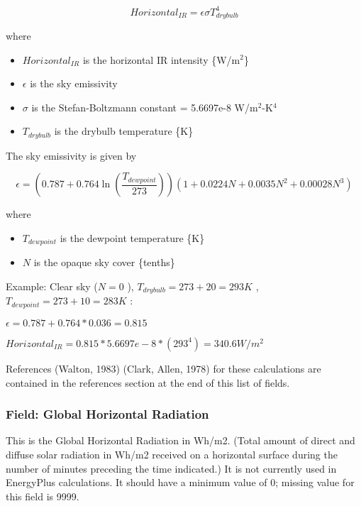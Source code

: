 \begin{equation}
Horizontal_{IR} = \epsilon\sigma T^4_{drybulb}
\end{equation}

where

\begin{itemize}
\tightlist
\item
  \(Horizontal_{IR}\) is the horizontal IR intensity \{W/m\(^{2}\)\}
\item
  \(\epsilon\) is the sky emissivity
\item
  \(\sigma\) is the Stefan-Boltzmann constant = 5.6697e-8 W/m\(^{2}\)-K\(^{4}\)
\item
  \(T_{drybulb}\) is the drybulb temperature \{K\}
\end{itemize}

The sky emissivity is given by

\begin{equation}
\epsilon = \left( 0.787 +0.764 \ln\left(\frac{T_{dewpoint}}{273}\right)\right)\left( 1 + 0.0224N + 0.0035N^2 + 0.00028N^3 \right)
\end{equation}

where

\begin{itemize}
\tightlist
\item
  \(T_{dewpoint}\) is the dewpoint temperature \{K\}
\item
  \(N\) is the opaque sky cover \{tenths\}
\end{itemize}

Example: Clear sky (\(N = 0\) ), \(T_{drybulb} = 273+20 = 293 K\) , \(T_{dewpoint} = 273+10 = 283 K\) :

\(\epsilon = 0.787 + 0.764*0.036 = 0.815\)

\(Horizontal_{IR} = 0.815*5.6697e-8*(293^4) = 340.6 W/m^2\)

References (Walton, 1983) (Clark, Allen, 1978) for these calculations are contained in the references section at the end of this list of fields.

\subsubsection{Field: Global Horizontal Radiation}\label{field-global-horizontal-radiation}

This is the Global Horizontal Radiation in Wh/m2. (Total amount of direct and diffuse solar radiation in Wh/m2 received on a horizontal surface during the number of minutes preceding the time indicated.) It is not currently used in EnergyPlus calculations. It should have a minimum value of 0; missing value for this field is 9999.

